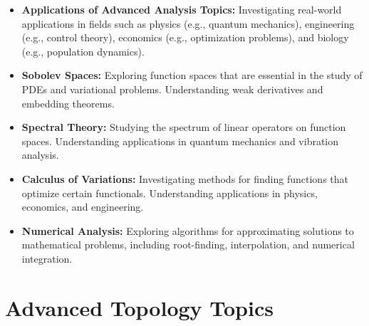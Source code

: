 \documentclass[openany]{book}
\begin{document}
\begin{itemize}
    \item \textbf{Applications of Advanced Analysis Topics:} Investigating real-world applications in fields such as physics (e.g., quantum mechanics), engineering (e.g., control theory), economics (e.g., optimization problems), and biology (e.g., population dynamics).
    \item \textbf{Sobolev Spaces:} Exploring function spaces that are essential in the study of PDEs and variational problems. Understanding weak derivatives and embedding theorems.
    \item \textbf{Spectral Theory:} Studying the spectrum of linear operators on function spaces. Understanding applications in quantum mechanics and vibration analysis.
    \item \textbf{Calculus of Variations:} Investigating methods for finding functions that optimize certain functionals. Understanding applications in physics, economics, and engineering.
    \item \textbf{Numerical Analysis:} Exploring algorithms for approximating solutions to mathematical problems, including root-finding, interpolation, and numerical integration.
\end{itemize}
\section{Advanced Topology Topics}
\end{document}
